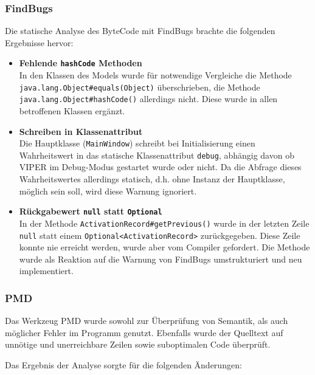 \documentclass[parskip=full,11pt,twoside]{scrartcl}
\begin{document}
\subsubsection{FindBugs}

Die statische Analyse des ByteCode mit FindBugs brachte die folgenden Ergebnisse hervor:

\begin{itemize}
  \item \textbf{Fehlende \texttt{hashCode} Methoden}\\
        In den Klassen des Models wurde für notwendige Vergleiche die Methode \texttt{java.lang.Object\#equals(Object)} überschrieben, die Methode \texttt{java.lang.Object\#hashCode()} allerdings nicht. Diese wurde in allen betroffenen Klassen ergänzt.
  \item \textbf{Schreiben in Klassenattribut}\\
        Die Hauptklasse (\texttt{MainWindow}) schreibt bei Initialisierung einen Wahrheitswert in das statische Klassenattribut \texttt{debug}, abhängig davon ob VIPER im Debug-Modus gestartet wurde oder nicht. Da die Abfrage dieses Wahrheitswertes allerdings statisch, d.h. ohne Instanz der Hauptklasse, möglich sein soll, wird diese Warnung ignoriert.
  \item \textbf{Rückgabewert \texttt{null} statt \texttt{Optional}}\\
        In der Methode \texttt{ActivationRecord\#getPrevious()} wurde in der letzten Zeile \texttt{null} statt einem \texttt{Optional<ActivationRecord>} zurückgegeben. Diese Zeile konnte nie erreicht werden, wurde aber vom Compiler gefordert. Die Methode wurde als Reaktion auf die Warnung von FindBugs umstrukturiert und neu implementiert.
\end{itemize}

\subsubsection{PMD}

Das Werkzeug PMD wurde sowohl zur Überprüfung von Semantik, als auch möglicher Fehler im Programm genutzt. Ebenfalls wurde der Quelltext auf unnötige und unerreichbare Zeilen sowie suboptimalen Code überprüft.

Das Ergebnis der Analyse sorgte für die folgenden Änderungen:
\end{document}
